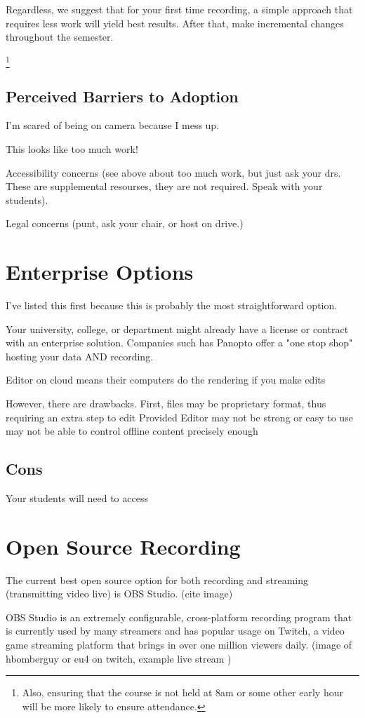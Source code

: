 \documentclass[sigconf]{acmart}
\begin{document}
Regardless, we suggest that for your first time recording, a simple approach that requires less work will yield best results.  
After that, make incremental changes throughout the semester.

\footnote{Also, ensuring that the course is not held at 8am or some other early hour will be more likely to ensure attendance.}

\subsection{Perceived Barriers to Adoption}
I'm scared of being on camera because I mess up.

This looks like too much work!

Accessibility concerns (see above about too much work, but just ask your drs.  These are supplemental resourses, they are not required.  Speak with your students).

Legal concerns (punt, ask your chair, or host on drive.)

\section{Enterprise Options}
I've listed this first because this is probably the most straightforward option.

Your university, college, or department might already have a license or contract with an enterprise solution.
Companies such has Panopto  offer a "one stop shop" hosting your data AND recording.


Editor on cloud means their computers do the rendering if you make edits

However, there are drawbacks.
First, files may be proprietary format, thus requiring an extra step to edit
Provided Editor may not be strong or easy to use
may not be able to control offline content precisely enough

\subsection{Cons}
Your students will need to access

\section{Open Source Recording}
The current best open source option for both recording and streaming (transmitting video live) is OBS Studio. (cite image)

OBS Studio is an extremely configurable, cross-platform recording program that is currently used by many streamers and has popular usage on Twitch, a video game streaming platform that brings in over one million viewers daily.  (image of hbomberguy or eu4 on twitch, example live stream )
\end{document}
